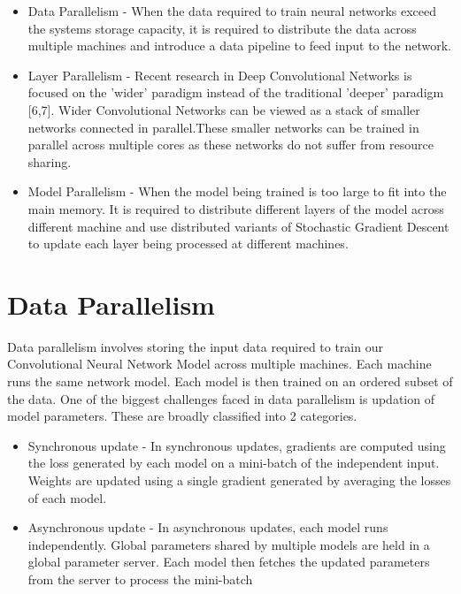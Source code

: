 \documentclass[sigconf]{acmart}
\begin{document}
\begin{itemize}
\setlength\itemsep{1em}
\item Data Parallelism - When the data required to train neural networks exceed the systems storage capacity, it is required to distribute the data across multiple machines and introduce a data pipeline to feed input to the network.
\item Layer Parallelism - Recent research in Deep Convolutional Networks is focused on the 'wider' paradigm instead of the traditional 'deeper' paradigm [6,7]. Wider Convolutional Networks can be viewed as a stack of smaller networks connected in parallel.These smaller networks can be trained in parallel across multiple cores as these networks do not suffer from resource sharing.
\item Model Parallelism - When the model being trained is too large to fit into the main memory. It is required to distribute different layers of the model across different machine and use distributed variants of Stochastic Gradient Descent to update each layer being processed at different machines.  
\end{itemize}

\section{Data Parallelism}

Data parallelism involves storing the input data required to train our Convolutional Neural Network Model across multiple machines. Each machine runs the same network model. Each model is then trained on an ordered subset of the data. One of the biggest challenges faced in data parallelism is updation of model parameters. These are broadly classified into 2 categories.

\begin{itemize}
\setlength\itemsep{1em}
\item Synchronous update - In synchronous updates, gradients are computed using the loss generated by each model on a mini-batch of the independent input. Weights are updated using a single gradient generated by averaging the losses of each model.

\item Asynchronous update - In asynchronous updates, each model runs independently. Global parameters shared by multiple models are held in a global parameter server. Each model then fetches the updated parameters from the server to process the mini-batch
\end{itemize}
\end{document}
